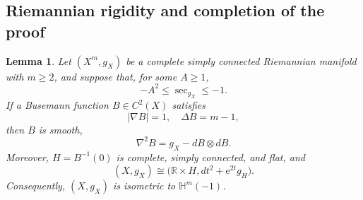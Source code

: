 \documentclass[12pt]{amsart}
\newtheorem{lemma}[theorem]{Lemma}
\theoremstyle{definition}
\numberwithin{equation}{section}
\newcommand{\ee}{{\mathrm{e}}}
\newcommand{\R}{\mathbb{R}}
\begin{document}
\subsection{Riemannian rigidity and completion of the proof}

\begin{lemma}
\label{lem:riemannian-rigidity}
Let \((X^m,g_X)\) be a complete simply connected Riemannian manifold with
\(m\geq2\), and suppose that, for some \(A\geq1\),
\[
  -A^2\leq\sec_{g_X}\leq-1.
\]
If a Busemann function \(B\in C^2(X)\) satisfies
\[
  |\nabla B|=1,
  \quad
  \Delta B=m-1,
\]
then \(B\) is smooth,
\begin{equation}\label{eq:hessian-equality}
  \nabla^2B=g_X-dB\otimes dB.
\end{equation}
Moreover, \(H=B^{-1}(0)\) is complete, simply connected, and flat, and
\begin{equation}\label{eq:warped-product}
  (X,g_X)
  \cong
  \bigl(\R\times H,dt^2+\ee^{2t}g_H\bigr).
\end{equation}
Consequently, \((X,g_X)\) is isometric to
\(\mathbb H^m(-1)\).
\end{lemma}
\end{document}
